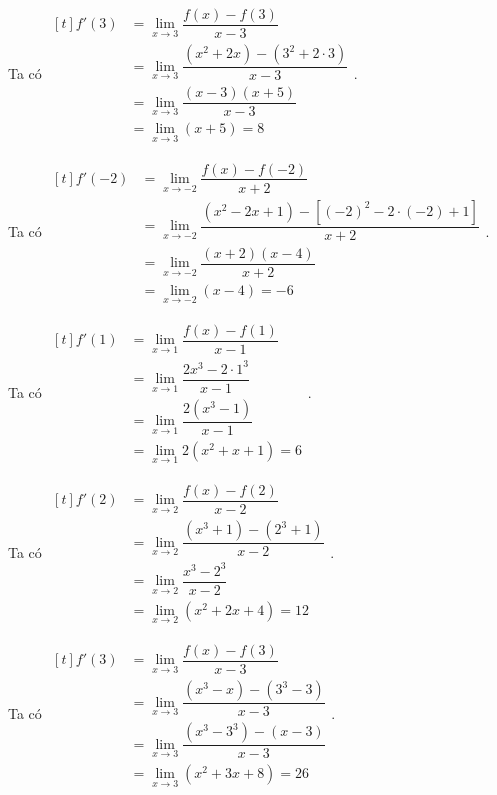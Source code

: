 \begin{bt}
\begin{vd}
{\begin{listEX}[2]
	Ta có 
	$\begin{aligned}[t]
	f'(3)
	&=\lim\limits_{x \to 3}\dfrac{f(x)-f(3)}{x-3}\\
	&=\lim\limits_{x \to 3}\dfrac{(x^2+2x)-(3^2+2\cdot 3)}{x-3}\\
	&=\lim\limits_{x \to 3}\dfrac{(x-3)(x+5)}{x-3}\\
	&=\lim\limits_{x \to 3}(x+5)=8
	\end{aligned}
	$.
	\item 
	Ta có 
	$\begin{aligned}[t]
	f'(-2)
	&=\lim\limits_{x \to -2}\dfrac{f(x)-f(-2)}{x+2}\\
	&=\lim\limits_{x \to -2}\dfrac{(x^2-2x+1)-\left[ (-2)^2-2\cdot(-2)+1\right]}{x+2}\\
	&=\lim\limits_{x \to -2}\dfrac{(x+2)(x-4)}{x+2}\\
	&=\lim\limits_{x \to -2}(x-4)=-6
	\end{aligned}
	$.
	\item 
	Ta có 
	$\begin{aligned}[t]
	f'(1)
	&=\lim\limits_{x \to 1}\dfrac{f(x)-f(1)}{x-1}\\
	&=\lim\limits_{x \to 1}\dfrac{2x^3-2\cdot 1^3}{x-1}\\
	&=\lim\limits_{x \to 1}\dfrac{2(x^3-1)}{x-1}\\
	&=\lim\limits_{x \to 1}2(x^2+x+1)=6
	\end{aligned}
	$.
	\item 
	Ta có 
	$\begin{aligned}[t]
	f'(2)
	&=\lim\limits_{x \to 2}\dfrac{f(x)-f(2)}{x-2}\\
	&=\lim\limits_{x \to 2}\dfrac{(x^3+1)-(2^3+1)}{x-2}\\
	&=\lim\limits_{x \to 2}\dfrac{x^3-2^3}{x-2}\\
	&=\lim\limits_{x \to 2}(x^2+2x+4)=12
	\end{aligned}
	$.
	\item 
	Ta có 
	$\begin{aligned}[t]
	f'(3)
	&=\lim\limits_{x \to 3}\dfrac{f(x)-f(3)}{x-3}\\
	&=\lim\limits_{x \to 3}\dfrac{(x^3-x)-(3^3-3)}{x-3}\\
	&=\lim\limits_{x \to 3}\dfrac{(x^3-3^3)-(x-3)}{x-3}\\
	&=\lim\limits_{x \to 3}(x^2+3x+8)=26
	\end{aligned}
	$.
	\end{listEX}
	}
\end{vd}
\begin{vd}%

\end{vd}
\end{bt}
